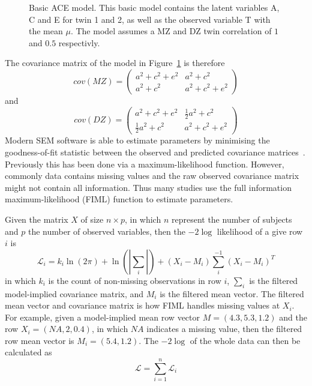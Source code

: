\begin{figure}[htpb]
  \centering
  \scalebox{0.6}{}
  \caption[ACE Model]{
    Basic ACE model.
    This basic model contains the latent variables A, C and E for twin 1 and 2, as well as the observed variable T with the mean $\mu$.
    The model assumes a MZ and DZ twin correlation of $1$ and $0.5$ respectivly.
  }\label{fig:ace}
\end{figure}

The covariance matrix of the model in Figure~\ref{fig:ace} is therefore
\begin{equation}
  cov(MZ) = 
  \begin{pmatrix}
    a^2 + c^2 + e^2 & a^2 + c^2 \\
    a^2 + c^2 & a^2 + c^2 + e^2
  \end{pmatrix}
\end{equation}
and 
\begin{equation}
  cov(DZ) = 
  \begin{pmatrix}
    a^2 + c^2 + e^2 & \frac{1}{2}a^2 + c^2 \\
    \frac{1}{2}a^2 + c^2 & a^2 + c^2 + e^2
  \end{pmatrix}
\end{equation}
Modern SEM software is able to estimate parameters by minimising the goodness-of-fit statistic between the observed and predicted covariance matrices~\cite{Boker2011}.
Previously this has been done via a maximum-likelihood function.
However, commonly data contains missing values and the raw observed covariance matrix might not contain all information.
Thus many studies use the full information maximum-likelihood (FIML) function to estimate parameters.

Given the matrix $X$ of size $n\times p$, in which $n$ represent the number of subjects and $p$ the number of observed variables, then the $-2\log$ likelihood of a give row $i$ is
\begin{equation}\label{eq:fiml}
  \mathcal{L}_i = k_i \ln(2\pi) + \ln(|\sum_i|) + (X_i - M_i)\sum_i^{-1}(X_i -M_i)^{T} 
\end{equation}
in which $k_i$ is the count of non-missing observations in row $i$, $\sum_i$ is the filtered model-implied covariance matrix, and $M_i$ is the filtered mean vector.
The filtered mean vector and covariance matrix is how FIML handles missing values at $X_i$.
For example, given a model-implied mean row vector $M=(4.3, 5.3, 1.2)$ and the row $X_i=(NA, 2, 0.4)$, in which $NA$ indicates a missing value, then the filtered row mean vector is $M_i = (5.4, 1.2)$. 
The $-2\log$ of the whole data can then be calculated as
\begin{equation}
  \mathcal{L} = \sum^n_{i=1} \mathcal{L}_i
\end{equation}

